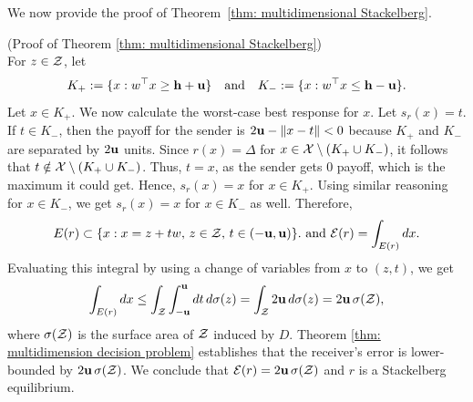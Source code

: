 We now provide the proof of Theorem~\ref{thm: multidimensional Stackelberg}.

\begin{apdxproof}{(Proof of Theorem \ref{thm: multidimensional Stackelberg})}\label{proof: multidimensional stackelberg}\\
For $z \in \mathcal{Z}$, let
\[
K_+ := \{x : w^\top x \geq \mathbf{h} + \mathbf{u}\} \quad \text{and} \quad K_- := \{x : w^\top x \leq \mathbf{h} - \mathbf{u}\}.
\]
Let $x \in K_+$. We now calculate the worst-case best response for $x$. Let $s_r(x) = t$. If $t \in K_-$, then the payoff for the sender is $2\mathbf{u} - \|x - t\| < 0$ because $K_+$ and $K_-$ are separated by $2\mathbf{u}$ units. Since $r(x) = \Delta$ for $x \in \mathcal{X} \setminus (K_+ \cup K_-)$, it follows that $t \notin \mathcal{X} \setminus (K_+ \cup K_-)$. Thus, $t = x$, as the sender gets $0$ payoff, which is the maximum it could get. Hence, $s_r(x) = x$ for $x \in K_+$. Using similar reasoning for $x \in K_-$, we get $s_r(x) = x$ for $x \in K_-$ as well. Therefore,
\[
E(r) \subset \{x : x = z + t w,\, z \in \mathcal{Z},\, t \in (-\mathbf{u}, \mathbf{u})\}.
\text{ and } 
\mathcal{E}(r) = \int_{E(r)} dx.
\]
Evaluating this integral by using a change of variables from $x$ to $(z, t)$, we get
\[
\int_{E(r)} dx \leq \int_{\mathcal{Z}} \int_{-\mathbf{u}}^{\mathbf{u}} dt\, d\sigma(z) = \int_{\mathcal{Z}} 2\mathbf{u}\, d\sigma(z) = 2\mathbf{u}\, \sigma(\mathcal{Z}),
\]
where $\sigma(\mathcal{Z})$ is the surface area of $\mathcal{Z}$ induced by $D$.
Theorem \ref{thm: multidimension decision problem} establishes that the receiver's error is lower-bounded by $2\mathbf{u}\,\sigma(\mathcal{Z})$. We conclude that $\mathcal{E}(r) = 2\mathbf{u}\, \sigma(\mathcal{Z})$ and $r$ is a Stackelberg equilibrium.
\end{apdxproof}
